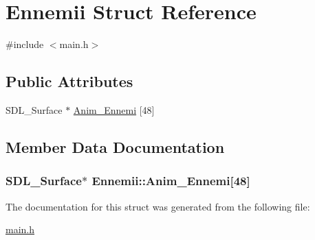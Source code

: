 \hypertarget{structEnnemii}{}\section{Ennemii Struct Reference}
\label{structEnnemii}


{\ttfamily \#include $<$main.\+h$>$}

\subsection*{Public Attributes}
\begin{DoxyCompactItemize}
\item 
S\+D\+L\+\_\+\+Surface $\ast$ \hyperlink{structEnnemii_a2190c09b70916b8caf24da98f183e9aa}{Anim\+\_\+\+Ennemi} \mbox{[}48\mbox{]}
\end{DoxyCompactItemize}


\subsection{Member Data Documentation}
\subsubsection[{\texorpdfstring{Anim\+\_\+\+Ennemi}{Anim_Ennemi}}]{\setlength{\rightskip}{0pt plus 5cm}S\+D\+L\+\_\+\+Surface$\ast$ Ennemii\+::\+Anim\+\_\+\+Ennemi\mbox{[}48\mbox{]}}\hypertarget{structEnnemii_a2190c09b70916b8caf24da98f183e9aa}{}\label{structEnnemii_a2190c09b70916b8caf24da98f183e9aa}


The documentation for this struct was generated from the following file\+:\begin{DoxyCompactItemize}
\item 
\hyperlink{main_8h}{main.\+h}\end{DoxyCompactItemize}
